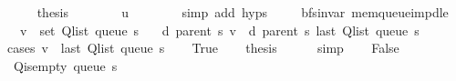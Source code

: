\begin{isabellebody}
\ \ \ \ \isamarkupfalse%
\ {\isacharquery}{\kern0pt}thesis\isanewline
\ \ \ \ \ \ \isamarkupfalse%
\ u\isanewline
\ \ \ \ \ \ \isamarkupfalse%
\ {\isacharparenleft}{\kern0pt}simp\ add{\isacharcolon}{\kern0pt}\ {\isachardoublequoteopen}{}{\isachardot}{\kern0pt}hyps{\isachardoublequoteclose}{\isacharparenright}{\kern0pt}\isanewline
\ \ \isamarkupfalse%
\isanewline
{}\isamarkupfalse%
%
\endisatagproof
{\isafoldproof}%
%
\isadelimproof
\isanewline
%
\endisadelimproof
\isanewline
{}\isamarkupfalse%
\ {\isacharparenleft}{\kern0pt}\ bfs{\isacharunderscore}{\kern0pt}invar{\isacharparenright}{\kern0pt}\ mem{\isacharunderscore}{\kern0pt}queue{\isacharunderscore}{\kern0pt}imp{\isacharunderscore}{\kern0pt}d{\isacharunderscore}{\kern0pt}le{\isacharcolon}{\kern0pt}\isanewline
\ \ \ {\isachardoublequoteopen}v\ {\isasymin}\ set\ {\isacharparenleft}{\kern0pt}Q{\isacharunderscore}{\kern0pt}list\ {\isacharparenleft}{\kern0pt}queue\ s{\isacharparenright}{\kern0pt}{\isacharparenright}{\kern0pt}{\isachardoublequoteclose}\isanewline
\ \ \ {\isachardoublequoteopen}d\ {\isacharparenleft}{\kern0pt}parent\ s{\isacharparenright}{\kern0pt}\ v\ {\isasymle}\ d\ {\isacharparenleft}{\kern0pt}parent\ s{\isacharparenright}{\kern0pt}\ {\isacharparenleft}{\kern0pt}last\ {\isacharparenleft}{\kern0pt}Q{\isacharunderscore}{\kern0pt}list\ {\isacharparenleft}{\kern0pt}queue\ s{\isacharparenright}{\kern0pt}{\isacharparenright}{\kern0pt}{\isacharparenright}{\kern0pt}{\isachardoublequoteclose}\isanewline
%
\isadelimproof
%
\endisadelimproof
%
\isatagproof
{}\isamarkupfalse%
\ {\isacharparenleft}{\kern0pt}cases\ {\isachardoublequoteopen}v\ {\isacharequal}{\kern0pt}\ last\ {\isacharparenleft}{\kern0pt}Q{\isacharunderscore}{\kern0pt}list\ {\isacharparenleft}{\kern0pt}queue\ s{\isacharparenright}{\kern0pt}{\isacharparenright}{\kern0pt}{\isachardoublequoteclose}{\isacharparenright}{\kern0pt}\isanewline
\ \ \isamarkupfalse%
\ True\isanewline
\ \ \isamarkupfalse%
\ {\isacharquery}{\kern0pt}thesis\isanewline
\ \ \ \ \isamarkupfalse%
\ simp\isanewline
{}\isamarkupfalse%
\isanewline
\ \ \isamarkupfalse%
\ False\isanewline
\ \ \isamarkupfalse%
\ {\isachardoublequoteopen}{\isasymnot}\ Q{\isacharunderscore}{\kern0pt}is{\isacharunderscore}{\kern0pt}empty\ {\isacharparenleft}{\kern0pt}queue\ s{\isacharparenright}{\kern0pt}{\isachardoublequoteclose}\isanewline

\end{isabellebody}
